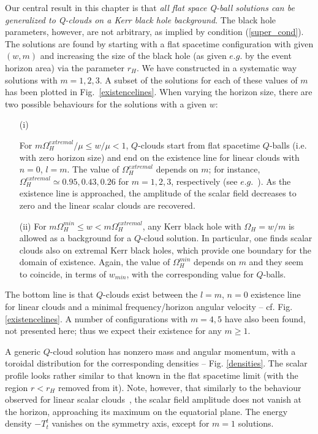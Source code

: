   
Our central result in this chapter is
that {\it all flat space Q-ball solutions can be generalized to Q-clouds on a Kerr black hole background}.
The black hole parameters, however, are not arbitrary, as implied by condition (\ref{super_cond}).
%
%
The solutions are found by starting with a flat spacetime
configuration with given $(w,m)$ and increasing the size of the black hole
(as given $e.g.$ by the event horizon area)
via the parameter $r_H$.  
We have constructed in a systematic way solutions with $m=1,2,3$. A subset of the solutions for each of these values of $m$ has been plotted in Fig.~\ref{existencelines}.  When varying the horizon size, there are two 
possible behaviours for the solutions with a given $w$: 
\begin{itemize}
\item[(i)]

For $m\Omega_H^{extremal}/\mu\leq w/\mu <1$,  $Q$-clouds start from flat spacetime $Q$-balls (i.e. with zero horizon size)
 and end on the existence line for linear clouds with $n=0$, $l=m$. The value of $\Omega_H^{extremal}$ depends on $m$; for instance,  $\Omega_H^{extremal}\simeq 0.95,0.43,0.26$  for $m=1,2,3$, respectively (see $e.g.$~\cite{Hod:2013zza}). As the existence line is approached,
the amplitude of the scalar field
decreases to zero and 
the linear scalar clouds are recovered.
 
\item[(ii)]
For  $m\Omega_H^{min}\leq w <m\Omega_H^{extremal}$,
any Kerr black hole with $\Omega_H=w/m$ is allowed as a background for a $Q$-cloud solution.
In particular, one finds scalar clouds also on extremal Kerr black holes,
which provide one boundary for the domain of existence. Again, the value of $\Omega_H^{min}$ depends on $m$ and they seem to coincide, in terms of $w_{min}$, with the corresponding value for $Q$-balls.
%

\end{itemize}
%
The bottom line is that $Q$-clouds exist between the $l=m$, $n=0$ existence line for linear clouds and a minimal frequency/horizon angular velocity -- cf. Fig. \ref{existencelines}. A number of configurations with $m=4,5$
have also been found, not presented here;
thus we expect their existence for any $m\geq 1$.

A generic $Q$-cloud solution has nonzero mass and angular momentum,
with a toroidal distribution for the corresponding densities -- Fig. \ref{densities}.
% 
The scalar profile looks rather similar to that known in the flat spacetime limit
(with the region $r<r_H$ removed from it).
Note, however, that similarly to the behaviour observed for linear scalar clouds~\cite{Benone:2014ssa}, 
the scalar field amplitude does not vanish at the horizon,
approaching its maximum on the equatorial plane.
The energy density $-T_t^t$
vanishes on the symmetry axis, except for $m=1$ solutions.


